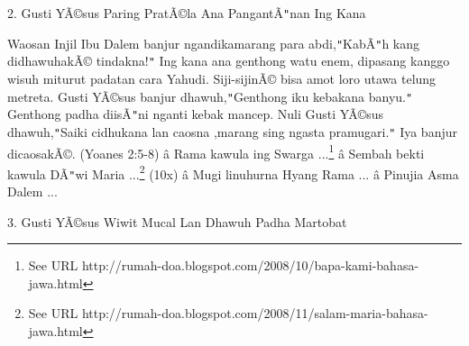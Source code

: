 
2. Gusti Y\~A\copyright{}sus Paring Prat\~A\copyright{}la Ana Pangant\~A\texttt{{}"{}}nan Ing Kana

\newline


Waosan Injil
Ibu Dalem banjur ngandikamarang para abdi,\texttt{{}"{}}Kab\~A\texttt{{}"{}}h kang didhawuhak\~A\copyright{} tindakna!\texttt{{}"{}} Ing kana ana genthong watu enem, dipasang kanggo wisuh miturut padatan cara Yahudi. Siji-sijin\~A\copyright{} bisa amot loro utawa telung metreta. Gusti Y\~A\copyright{}sus banjur dhawuh,\texttt{{}"{}}Genthong iku kebakana banyu.\texttt{{}"{}} Genthong padha diis\~A\texttt{{}"{}}ni nganti kebak mancep. Nuli Gusti Y\~A\copyright{}sus dhawuh,\texttt{{}"{}}Saiki cidhukana lan caosna ,marang sing ngasta pramugari.\texttt{{}"{}} Iya banjur dicaosak\~A\copyright{}. (Yoanes 2:5-8)
\newline
 \^a\*  Rama kawula ing Swarga ...\footnote{See URL http://rumah-doa.blogspot.com/2008/10/bapa-kami-bahasa-jawa.html}\newline
 \^a\*  Sembah bekti kawula D\~A\texttt{{}"{}}wi Maria ...\footnote{See URL http://rumah-doa.blogspot.com/2008/11/salam-maria-bahasa-jawa.html} (10x)\newline
 \^a\*  Mugi linuhurna Hyang Rama ...\newline
 \^a\*  Pinujia Asma Dalem ...\newline


3. Gusti Y\~A\copyright{}sus Wiwit Mucal Lan Dhawuh Padha Martobat

\newline


